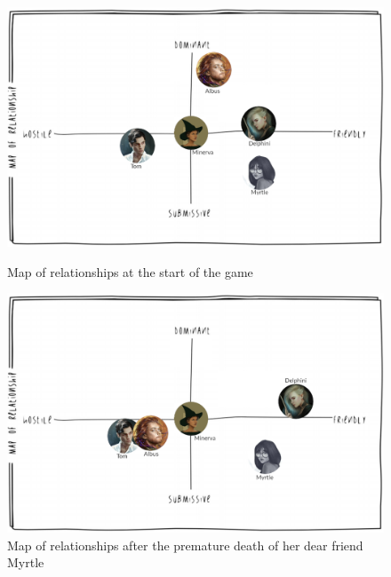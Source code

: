 \begin{figure}[H]
\includegraphics[max width=\textwidth]{../Pictures/Characters/Relationship_maps/Minerva_relmap.png} 
\captionsetup{labelformat=empty}
\caption{Map of relationships at the start of the game}
\includegraphics[max width=\textwidth]{../Pictures/Characters/Relationship_maps/Minerva_after_event_relmap.png} 
\captionsetup{labelformat=empty}
\caption{Map of relationships after the premature death of her dear friend Myrtle}
\end{figure}

\clearpage